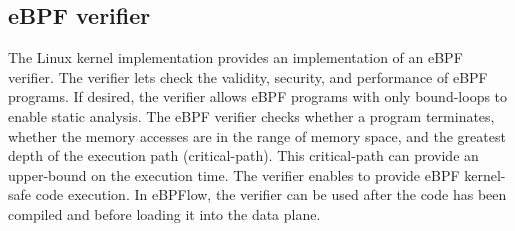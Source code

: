 



\subsection{eBPF verifier}
\label{sec:verifier}

The Linux kernel implementation provides an implementation of an eBPF verifier.
The verifier lets check the validity, security, and performance of eBPF programs.
If desired, the verifier allows eBPF programs with only bound-loops to enable static analysis.
The eBPF verifier checks whether a program terminates, whether the memory accesses are in the range of memory space, and the greatest depth of the execution path (critical-path).
This critical-path can provide an upper-bound on the execution time.
The verifier enables to provide eBPF kernel-safe code execution.
In eBPFlow, the verifier can be used after the code has been compiled and before loading it into the data plane.


